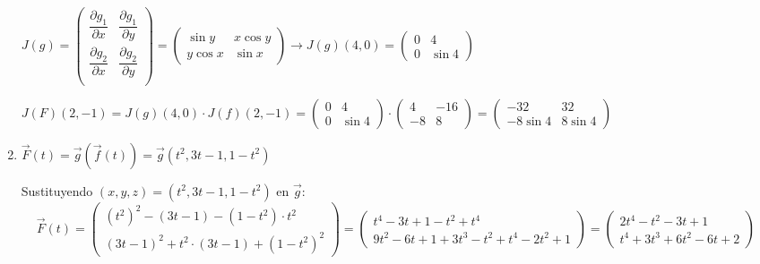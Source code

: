 \begin{enumerate}[label=\color{red}\textbf{\arabic*)}, leftmargin=*]
$J(g)=\begin{pmatrix}
\dfrac{\partial g_1}{\partial x} & \dfrac{\partial g_1}{\partial y}\\
\dfrac{\partial g_2}{\partial x} & \dfrac{\partial g_2}{\partial y}\\
\end{pmatrix}=\begin{pmatrix}
\sin y & x\cos y\\
y\cos x & \sin x
\end{pmatrix}\longrightarrow J(g)(4,0)=\begin{pmatrix}
0 & 4\\
0 & \sin 4
\end{pmatrix}$

$J(F)(2,-1)=J(g)(4,0)\cdot J(f)(2,-1)=\begin{pmatrix}
0 & 4\\
0 & \sin 4
\end{pmatrix}\cdot\begin{pmatrix}
4 & -16\\
-8 & 8
\end{pmatrix}=\begin{pmatrix}
-32 & 32\\
-8\sin 4 & 8\sin4
\end{pmatrix}$

\item {}

$\vec{F}(t)=\vec{g}(\vec{f}(t))=\vec{g}(t^2, 3t-1,1-t^2)$

Sustituyendo $(x,y,z)=(t^2, 3t-1,1-t^2)$ en $\vec{g}$: \[ \vec{F}(t)=\begin{pmatrix}
(t^2)^2-(3t-1)-(1-t^2)\cdot t^2\\
(3t-1)^2+t^2\cdot(3t-1)+(1-t^2)^2
\end{pmatrix}=\begin{pmatrix}
t^4-3t+1-t^2+t^4\\
9t^2-6t+1+3t^3-t^2+t^4-2t^2+1
\end{pmatrix}=\begin{pmatrix}
2t^4-t^2-3t+1\\
t^4+3t^3+6t^2-6t+2
\end{pmatrix} \]


\end{enumerate}
